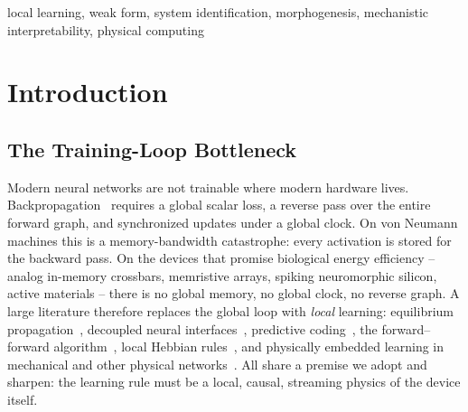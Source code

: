 \documentclass[conference]{IEEEtran}
\begin{document}
\begin{abstract}
constant power density. On a real signal -- the 277-year SILSO sunspot record -- the
same frozen weak-form identifier generalizes to unseen decades at ${\sim}500\times$
lower holdout error than finite-difference identification ($1.9{\times}10^{-5}$ vs.\
$9.1{\times}10^{-3}$), stays flat under 50\% added noise, and beats persistence at
one-month forecasts with ${\sim}10\times$ less memory than a reservoir. With a sparse
warm-started CG plant solver the same network runs at $10^4$ nodes with the
identification advantage and shape readability intact ($r\approx0.63$) and a memory
advantage that grows to ${\sim}630\times$. On a second real stream (NINO3.4 El
Ni\~no SST), the armor holds at ${\sim}22\times$ below finite-difference
identification, the identified law \emph{beats a trained LSTM} at 6- and 12-month
forecasts, and at 10\% of the data it is $5\times$ better while the reservoir
collapses -- the honest boundary (AR/ESN/LSTM lead long-horizon forecasts on the
smoother sunspot record) is stated, not tuned away. A theory section proves the
loop's guarantees: a $\Delta t$-independent $\lambda^2\sigma^2$ noise floor, RLS
contraction under persistence of excitation, monotone angulation ascent, and
closed-loop stability (morphogenesis perturbs identification by ${\sim}7\%$).
\end{abstract}

\begin{IEEEkeywords}
local learning, weak form, system identification, morphogenesis, mechanistic
interpretability, physical computing
\end{IEEEkeywords}

\section{Introduction}
\subsection{The Training-Loop Bottleneck}
Modern neural networks are not trainable where modern hardware lives.
Backpropagation~\cite{BP86} requires a global scalar loss, a reverse pass over the
entire forward graph, and synchronized updates under a global clock. On von Neumann
machines this is a memory-bandwidth catastrophe: every activation is stored for the
backward pass. On the devices that promise biological energy efficiency -- analog
in-memory crossbars, memristive arrays, spiking neuromorphic silicon, active
materials -- there is no global memory, no global clock, no reverse graph. A large
literature therefore replaces the global loop with \emph{local} learning: equilibrium
propagation~\cite{EP17}, decoupled neural interfaces~\cite{DNI17}, predictive
coding~\cite{RB99}, the forward--forward algorithm~\cite{FF22}, local Hebbian
rules~\cite{KH19}, and physically embedded learning in mechanical and other physical
networks~\cite{Stern21,MN24}. All share a premise we adopt and sharpen: the learning
rule must be a local, causal, streaming physics of the device itself.
\end{document}

